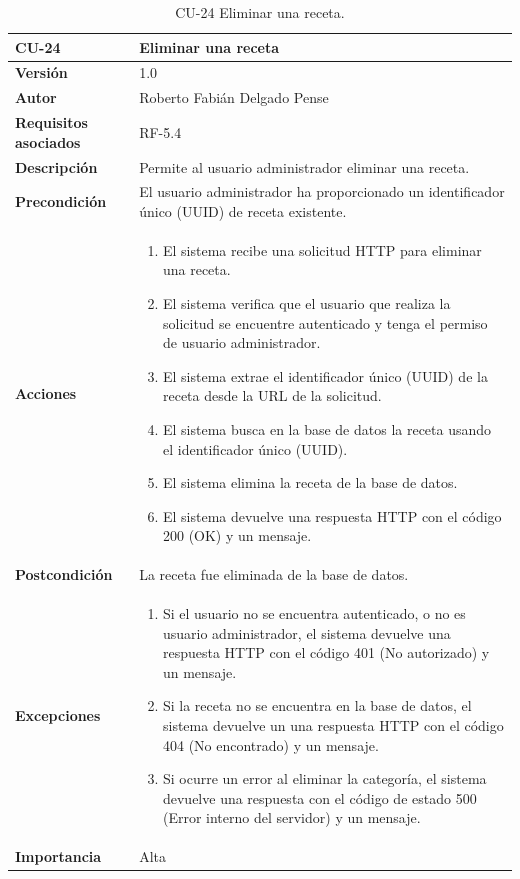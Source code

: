\begin{table}[p]
	\centering
	\begin{tabularx}{\linewidth}{ p{} p{} }
		\toprule
		\textbf{CU-24}    & \textbf{Eliminar una receta}\\
		\toprule
		\textbf{Versión}              & 1.0    \\
		\textbf{Autor}                & Roberto Fabián Delgado Pense \\
		\textbf{Requisitos asociados} & RF-5.4 \\ 
		\textbf{Descripción}          & Permite al usuario administrador eliminar una receta. \\
		\textbf{Precondición}         & El usuario administrador ha proporcionado un identificador único (UUID) de receta existente.\\
		\textbf{Acciones}             &
		\begin{enumerate}
			\def\labelenumi{\arabic{enumi}.}
			\tightlist
			\item El sistema recibe una solicitud HTTP para eliminar una receta.
                   \item El sistema verifica que el usuario que realiza la solicitud se encuentre autenticado y tenga el permiso de usuario administrador.
			\item El sistema extrae el identificador único (UUID) de la receta desde la URL de la solicitud.
                \item El sistema busca en la base de datos la receta usando el identificador único (UUID).
                \item El sistema elimina la receta de la base de datos.
                \item El sistema devuelve una respuesta HTTP con el código 200 (OK) y un mensaje.
            \end{enumerate}\\
		\textbf{Postcondición}        & La receta fue eliminada de la base de datos.\\
		\textbf{Excepciones}          & 
            \begin{enumerate}
			\def\labelenumi{\arabic{enumi}.}
			\tightlist
   			\item Si el usuario no se encuentra autenticado, o no es usuario administrador, el sistema devuelve una                 respuesta HTTP con el código 401 (No autorizado) y un mensaje.
                \item   Si la receta no se encuentra en la base de datos, el sistema devuelve un                           una respuesta HTTP con el código 404 (No encontrado) y un mensaje. 
                \item Si ocurre un error al eliminar la categoría, el sistema devuelve una respuesta con el código de estado 500 (Error interno del servidor) y un mensaje.
            \end{enumerate}\\
		\textbf{Importancia}          & Alta \\
		\bottomrule
	\end{tabularx}
	\caption{CU-24 Eliminar una receta.}
\end{table}

